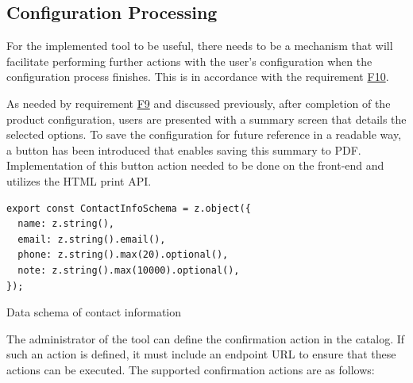 \subsection{Configuration Processing}

For the implemented tool to be useful, there needs to be a mechanism that will facilitate performing further actions with the user's configuration when the configuration process finishes. This is in accordance with the requirement \hyperref[itm:F10]{F10}.

As needed by requirement \hyperref[itm:F9]{F9} and discussed previously, after completion of the product configuration, users are presented with a summary screen that details the selected options. To save the configuration for future reference in a readable way, a button has been introduced that enables saving this summary to PDF. Implementation of this button action needed to be done on the front-end and utilizes the HTML print API.

\begin{listing}[h]
\begin{verbatim}
export const ContactInfoSchema = z.object({
  name: z.string(),
  email: z.string().email(),
  phone: z.string().max(20).optional(),
  note: z.string().max(10000).optional(),
});
\end{verbatim}
\caption{Data schema of contact information}
\label{listing:schema-contactinformation}
\end{listing}

The administrator of the tool can define the confirmation action in the catalog. If such an action is defined, it must include an endpoint URL to ensure that these actions can be executed. The supported confirmation actions are as follows:

